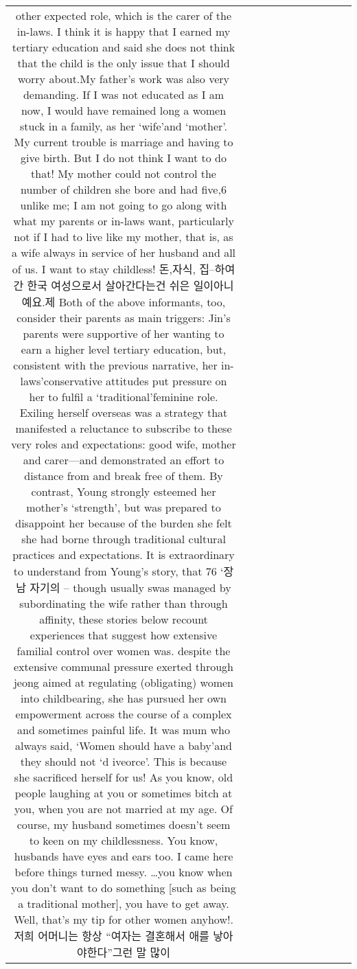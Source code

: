 \begin{table}[h!]
\begin{tabular}{|c|c|c|c|c|c|c|c|c|c|c|}
{other expected role, which is the carer of the in-laws. I think it is happy that I earned my tertiary education and said she does not think that the child is the only issue that I should worry about.My father's work was also very demanding. If I was not
educated as I am now, I would have remained long a women stuck in a family,
as her ‘wife’and ‘mother’. My current trouble is marriage and having to give birth.
But I do not think I want to do that! My mother could not control the number of
children she bore and had five,6 unlike me; I am not going to go along with what my
parents or in-laws want, particularly not if I had to live like my mother, that is, as
a wife always in service of her husband and all of us. I want to stay childless! 돈,자식, 집–하여간 한국 여성으로서 살아간다는건 쉬은 일이아니예요.제
Both of the above informants, too, consider their parents as main triggers: Jin’s parents were supportive of her wanting to earn a higher level tertiary education, but, consistent with the previous narrative, her in-laws’conservative attitudes put pressure on her to fulfil a ‘traditional’feminine role. Exiling herself overseas was a strategy that manifested a reluctance to subscribe to these very roles and expectations: good wife, mother and carer—and demonstrated an effort to distance from and break free of them.
By contrast, Young strongly esteemed her mother’s ‘strength’, but was prepared to disappoint her because of the burden she felt she had borne through traditional cultural practices and expectations. It is extraordinary to understand from Young’s story, that
76 ‘장남 자기의 – though usually swas managed by subordinating the wife rather than through affinity, these stories below recount experiences that suggest how extensive familial control over women was.
despite the extensive communal pressure exerted through jeong aimed at regulating (obligating) women into childbearing, she has pursued her own empowerment across the course of a complex and sometimes painful life.
It was mum who always said, ‘Women should have a baby’and they should not ‘d iveorce’. This is because she sacrificed herself for us! As you know, old people laughing at you or sometimes bitch at you, when you are not married at my age. Of course, my husband sometimes doesn’t seem to keen on my
childlessness. You know, husbands have eyes and ears too. I came here before things turned messy. …you know when you don’t want to do something [such as being a traditional mother], you have to get away. Well, that’s my tip for other women anyhow!. 저희 어머니는 항상 “여자는 결혼해서 애를 낳아야한다”그런 말 많이
}
\end{tabular}
\end{table}
